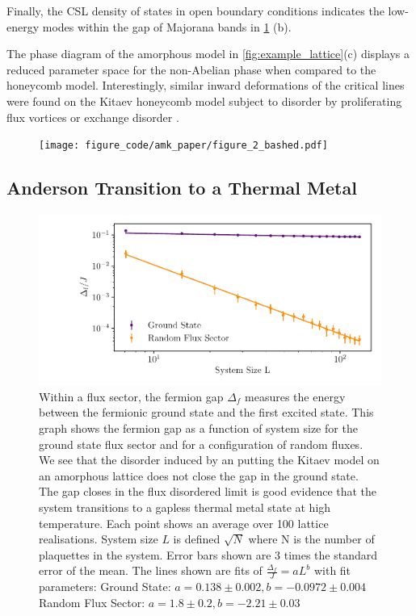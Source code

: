Finally, the CSL density of states in open boundary conditions indicates the low-energy modes within the gap of Majorana bands in \protect\hyperlink{fig:edge_modes}{1} (b).

The phase diagram of the amorphous model in \protect\hyperlink{fig:example_lattice}{{[}fig:example\_lattice{]}}(c) displays a reduced parameter space for the non-Abelian phase when compared to the honeycomb model. Interestingly, similar inward deformations of the critical lines were found on the Kitaev honeycomb model subject to disorder by proliferating flux vortices \autocite{Nasu_Thermal_2015} or exchange disorder \autocite{knolle_dynamics_2016}.

\begin{figure}
\hypertarget{fig:figure_2_bashed}{%
\centering
\texttt{[image: figure\_code/amk\_paper/figure\_2\_bashed.pdf]}
\caption{}\label{fig:figure_2_bashed}
}
\end{figure}

\hypertarget{anderson-transition-to-a-thermal-metal}{%
\subsection{Anderson Transition to a Thermal Metal}\label{anderson-transition-to-a-thermal-metal}}

\begin{figure}
\hypertarget{fig:fermion_gap_vs_L}{%
\centering
\includegraphics[width=1.14\textwidth,height=\textheight]{figure_code/amk_chapter/results/fermion_gap_vs_L/fermion_gap_vs_L.pdf}
\caption{Within a flux sector, the fermion gap \(\Delta_f\) measures the energy between the fermionic ground state and the first excited state. This graph shows the fermion gap as a function of system size for the ground state flux sector and for a configuration of random fluxes. We see that the disorder induced by an putting the Kitaev model on an amorphous lattice does not close the gap in the ground state. The gap closes in the flux disordered limit is good evidence that the system transitions to a gapless thermal metal state at high temperature. Each point shows an average over 100 lattice realisations. System size \(L\) is defined \(\sqrt{N}\) where N is the number of plaquettes in the system. Error bars shown are \(3\) times the standard error of the mean. The lines shown are fits of \(\tfrac{\Delta_f}{J} = aL ^ b\) with fit parameters: Ground State: \(a = 0.138 \pm 0.002, b = -0.0972 \pm 0.004\) Random Flux Sector: \(a = 1.8 \pm 0.2, b = -2.21 \pm 0.03\)}\label{fig:fermion_gap_vs_L}
}
\end{figure}

